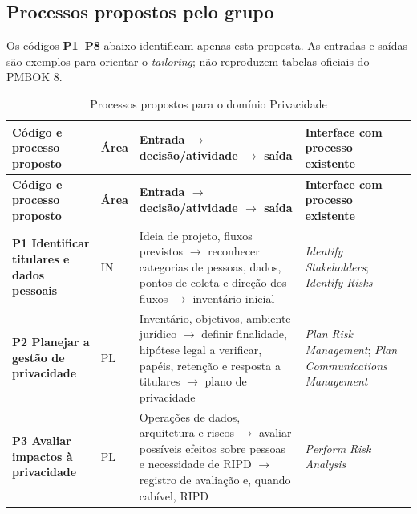 \documentclass[11pt,a4paper]{article}
\newcommand{\SingleSpacing}{}
\begin{document}
\subsection{Processos propostos pelo grupo}

Os códigos \textbf{P1–P8} abaixo identificam apenas esta proposta. As entradas e saídas são exemplos para orientar o \textit{tailoring}; não reproduzem tabelas oficiais do PMBOK 8.

\begingroup\SingleSpacing\footnotesize
\begin{longtable}{@{}>{\raggedright\arraybackslash}p{}>{\raggedright\arraybackslash}p{}>{\raggedright\arraybackslash}p{}>{\raggedright\arraybackslash}p{}@{}}
\caption{Processos propostos para o domínio Privacidade}\label{tab:t3}\\
\toprule
\textbf{Código e processo proposto} & \textbf{Área} & \textbf{Entrada \ensuremath{\rightarrow} decisão/atividade \ensuremath{\rightarrow} saída} & \textbf{Interface com processo existente}\\
\midrule
\endfirsthead
\toprule
\textbf{Código e processo proposto} & \textbf{Área} & \textbf{Entrada \ensuremath{\rightarrow} decisão/atividade \ensuremath{\rightarrow} saída} & \textbf{Interface com processo existente}\\
\midrule
\endhead
\bottomrule
\endfoot
\bottomrule
\endlastfoot
\textbf{P1 Identificar titulares e dados pessoais} & IN & Ideia de projeto, fluxos previstos \ensuremath{\rightarrow} reconhecer categorias de pessoas, dados, pontos de coleta e direção dos fluxos \ensuremath{\rightarrow} inventário inicial & \textit{Identify Stakeholders}; \textit{Identify Risks}\\[3pt]
\textbf{P2 Planejar a gestão de privacidade} & PL & Inventário, objetivos, ambiente jurídico \ensuremath{\rightarrow} definir finalidade, hipótese legal a verificar, papéis, retenção e resposta a titulares \ensuremath{\rightarrow} plano de privacidade & \textit{Plan Risk Management}; \textit{Plan Communications Management}\\[3pt]
\textbf{P3 Avaliar impactos à privacidade} & PL & Operações de dados, arquitetura e riscos \ensuremath{\rightarrow} avaliar possíveis efeitos sobre pessoas e necessidade de RIPD \ensuremath{\rightarrow} registro de avaliação e, quando cabível, RIPD & \textit{Perform Risk Analysis}\\[3pt]

\end{longtable}
\end{document}

